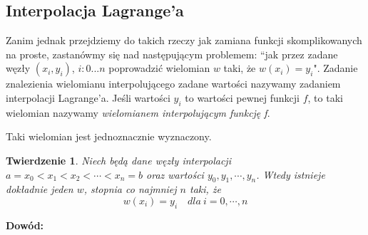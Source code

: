 \documentclass[hidelinks,a4paper,fleqn,oneside]{book}
\newtheorem{twierdz}{Twierdzenie}
\begin{document}
\subsection{Interpolacja Lagrange'a}
Zanim jednak przejdziemy do takich rzeczy jak zamiana funkcji skomplikowanych na proste, zastanówmy się nad następującym problemem: ``jak przez zadane węzły $(x_i, y_i)$, $i: 0...n$ poprowadzić wielomian $w$ taki, że $w(x_i) = y_i$". Zadanie znalezienia wielomianu interpolującego zadane wartości nazywamy zadaniem interpolacji Lagrange'a. Jeśli wartości $y_i$ to wartości pewnej funkcji $f$, to taki wielomian nazywamy \textit{wielomianem interpolującym funkcję f}.
\begin{center}
\end{center}

Taki wielomian jest jednoznacznie wyznaczony.
\begin{twierdz}
Niech będą dane węzły interpolacji $a = x_0 < x_1 < x_2 < \cdots < x_n = b$ oraz wartości $y_0, y_1, \cdots, y_n$. Wtedy istnieje dokładnie jeden $w$, stopnia co najmniej $n$ taki, że
\[
w(x_i) = y_i \quad dla\ i = 0, \cdots, n
\]
\end{twierdz}
\textbf{Dowód:}
\end{document}
